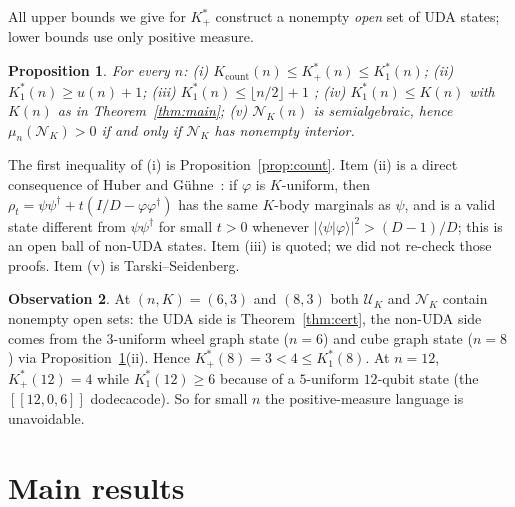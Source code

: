 \documentclass[aps,pra,onecolumn,superscriptaddress,nofootinbib,longbibliography,10pt]{revtex4-2}
\newtheorem{proposition}{Proposition}[section]
\theoremstyle{definition}
\newtheorem{observation}[proposition]{Observation}
\newcommand{\Kp}{K^{*}_{+}}
\newcommand{\Ko}{K^{*}_{1}}
\newcommand{\Kc}{K_{\mathrm{count}}}
\begin{document}
All upper bounds we give for $\Kp$ construct a nonempty \emph{open} set of UDA states; lower bounds use only positive measure.

\begin{proposition}\label{prop:rel}
For every $n$:
(i) $\Kc(n)\le\Kp(n)\le\Ko(n)$;
(ii) $\Ko(n)\ge u(n)+1$;
(iii) $\Ko(n)\le\lfloor n/2\rfloor+1$ \cite{JL05,HCLZ18};
(iv) $\Ko(n)\le K(n)$ with $K(n)$ as in Theorem~\ref{thm:main};
(v) $\mathcal N_K(n)$ is semialgebraic, hence $\mu_n(\mathcal N_K)>0$ if and only if $\mathcal N_K$ has nonempty interior.
\end{proposition}
\noindent The first inequality of (i) is Proposition~\ref{prop:count}. Item (ii) is a direct consequence of Huber and Gühne~\cite{HG16}: if $\varphi$ is $K$-uniform, then $\rho_t=\psi\psi^\dagger+t(I/D-\varphi\varphi^\dagger)$ has the same $K$-body marginals as $\psi$, and is a valid state different from $\psi\psi^\dagger$ for small $t>0$ whenever $|\langle\psi|\varphi\rangle|^2>(D-1)/D$; this is an open ball of non-UDA states. Item (iii) is quoted; we did not re-check those proofs. Item (v) is Tarski--Seidenberg.

\begin{observation}\label{obs:sep}
At $(n,K)=(6,3)$ and $(8,3)$ both $\mathcal U_K$ and $\mathcal N_K$ contain nonempty open sets: the UDA side is Theorem~\ref{thm:cert}, the non-UDA side comes from the $3$-uniform wheel graph state ($n=6$) and cube graph state ($n=8$) via Proposition~\ref{prop:rel}(ii). Hence $\Kp(8)=3<4\le\Ko(8)$. At $n=12$, $\Kp(12)=4$ while $\Ko(12)\ge6$ because of a $5$-uniform $12$-qubit state (the $[[12,0,6]]$ dodecacode). So for small $n$ the positive-measure language is unavoidable.
\end{observation}

\section{Main results}
\end{document}
